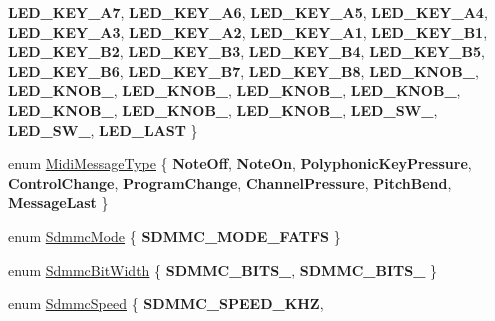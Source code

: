 \begin{DoxyCompactItemize}
{\bfseries L\+E\+D\+\_\+\+K\+E\+Y\+\_\+\+A7}, 
{\bfseries L\+E\+D\+\_\+\+K\+E\+Y\+\_\+\+A6}, 
{\bfseries L\+E\+D\+\_\+\+K\+E\+Y\+\_\+\+A5}, 
\newline
{\bfseries L\+E\+D\+\_\+\+K\+E\+Y\+\_\+\+A4}, 
{\bfseries L\+E\+D\+\_\+\+K\+E\+Y\+\_\+\+A3}, 
{\bfseries L\+E\+D\+\_\+\+K\+E\+Y\+\_\+\+A2}, 
{\bfseries L\+E\+D\+\_\+\+K\+E\+Y\+\_\+\+A1}, 
\newline
{\bfseries L\+E\+D\+\_\+\+K\+E\+Y\+\_\+\+B1}, 
{\bfseries L\+E\+D\+\_\+\+K\+E\+Y\+\_\+\+B2}, 
{\bfseries L\+E\+D\+\_\+\+K\+E\+Y\+\_\+\+B3}, 
{\bfseries L\+E\+D\+\_\+\+K\+E\+Y\+\_\+\+B4}, 
\newline
{\bfseries L\+E\+D\+\_\+\+K\+E\+Y\+\_\+\+B5}, 
{\bfseries L\+E\+D\+\_\+\+K\+E\+Y\+\_\+\+B6}, 
{\bfseries L\+E\+D\+\_\+\+K\+E\+Y\+\_\+\+B7}, 
{\bfseries L\+E\+D\+\_\+\+K\+E\+Y\+\_\+\+B8}, 
\newline
{\bfseries L\+E\+D\+\_\+\+K\+N\+O\+B\+\_}, 
{\bfseries L\+E\+D\+\_\+\+K\+N\+O\+B\+\_}, 
{\bfseries L\+E\+D\+\_\+\+K\+N\+O\+B\+\_}, 
{\bfseries L\+E\+D\+\_\+\+K\+N\+O\+B\+\_}, 
\newline
{\bfseries L\+E\+D\+\_\+\+K\+N\+O\+B\+\_}, 
{\bfseries L\+E\+D\+\_\+\+K\+N\+O\+B\+\_}, 
{\bfseries L\+E\+D\+\_\+\+K\+N\+O\+B\+\_}, 
{\bfseries L\+E\+D\+\_\+\+K\+N\+O\+B\+\_}, 
\newline
{\bfseries L\+E\+D\+\_\+\+S\+W\+\_}, 
{\bfseries L\+E\+D\+\_\+\+S\+W\+\_}, 
{\bfseries L\+E\+D\+\_\+\+L\+A\+ST}
 \}
\item 
enum \hyperlink{namespacedaisy_aaf09bb687034c8776ca0c68ed3ed4179}{Midi\+Message\+Type} \{ \newline
{\bfseries Note\+Off}, 
{\bfseries Note\+On}, 
{\bfseries Polyphonic\+Key\+Pressure}, 
{\bfseries Control\+Change}, 
\newline
{\bfseries Program\+Change}, 
{\bfseries Channel\+Pressure}, 
{\bfseries Pitch\+Bend}, 
{\bfseries Message\+Last}
 \}
\item 
enum \hyperlink{namespacedaisy_a06f91f8f9f006800c4b0cde1a650664b}{Sdmmc\+Mode} \{ {\bfseries S\+D\+M\+M\+C\+\_\+\+M\+O\+D\+E\+\_\+\+F\+A\+T\+FS}
 \}
\item 
enum \hyperlink{namespacedaisy_a5df1c73d4f0fdbf01d987cef4c3b165e}{Sdmmc\+Bit\+Width} \{ {\bfseries S\+D\+M\+M\+C\+\_\+\+B\+I\+T\+S\+\_}, 
{\bfseries S\+D\+M\+M\+C\+\_\+\+B\+I\+T\+S\+\_}
 \}
\item 
enum \hyperlink{namespacedaisy_aa4d107ebcf4d77d94b63c90fdba9cf93}{Sdmmc\+Speed} \{ {\bfseries S\+D\+M\+M\+C\+\_\+\+S\+P\+E\+E\+D\+\_\+K\+HZ}, 

\end{DoxyCompactItemize}

